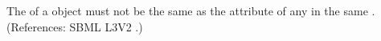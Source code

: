 The  of a \LocalParameter object must not be the same as the  attribute of any \SpeciesReference in the same \Reaction.
(References: SBML L3V2 .)
